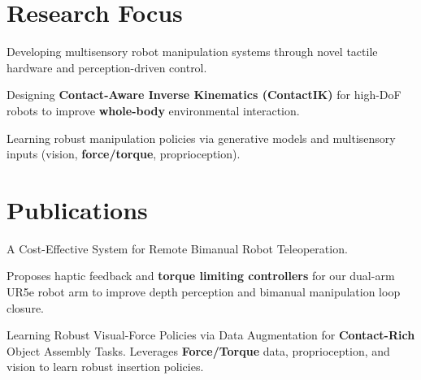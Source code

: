 \documentclass[]{deedy-resume-reversed}
\renewcommand{\sectionsep}{\vspace{1.0em}}
\begin{document}
\begin{minipage}[t]{0.62\textwidth}


\section{Research Focus}
\vspace{\topsep}
\begin{tightemize}
\item Developing multisensory robot manipulation systems through novel tactile hardware and perception-driven control.
\item Designing \textbf{Contact-Aware Inverse Kinematics (ContactIK)} for high-DoF robots to improve \textbf{whole-body} environmental interaction.
\item Learning robust manipulation policies via generative models and multisensory inputs (vision, \textbf{force/torque}, proprioception).
\end{tightemize}
\sectionsep


\section{Publications}
\begin{tightemize}
\item A Cost-Effective System for Remote Bimanual Robot Teleoperation.
\item Proposes haptic feedback and \textbf{torque limiting controllers} for our dual-arm UR5e robot arm to improve depth perception and bimanual manipulation loop closure. 
\end{tightemize}
\sectionsep

\begin{tightemize}
\item Learning Robust Visual-Force Policies via Data Augmentation for \textbf{Contact-Rich} Object Assembly Tasks. Leverages \textbf{Force/Torque} data, proprioception, and vision to learn robust insertion policies.
\end{tightemize}
\sectionsep


\end{minipage}
\end{document}
